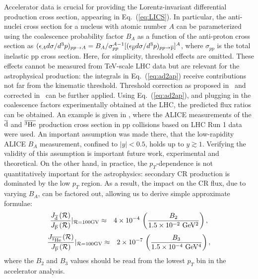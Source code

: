 Accelerator data is crucial for providing the Lorentz-invariant differential production cross section, appearing in Eq.~(\ref{eq:LICS}). 
In particular, the anti-nuclei cross section for a nucleus with atomic number $A$ can be parameterized using the coalescence probability factor $B_A$ as a function of the anti-proton cross section as 
$(\epsilon_A d\sigma/d^3p)_{pp\to A} = B_A/\sigma_{pp}^{A-1} [(\epsilon_{\overline{\rm p}} d\sigma/d^3p)_{pp\to \overline{\rm p}}]^A$, 
where $\sigma_{pp}$ is the total inelastic pp cross section. 
Here, for simplicity, threshold effects are omitted. 
These effects cannot be measured from TeV-scale LHC data but are relevant for the astrophysical production: the integrals in Eq.~(\ref{eq:ad2ap}) receive contributions not far from the kinematic threshold. 
Threshold correction as proposed in~\cite{Duperray:2002pj,Duperray:2003tv} and corrected in~\cite{Blum:2017qnn} can be further applied. 
%
Using Eq.~(\ref{eq:ad2ap}), and plugging in the coalescence factors experimentally obtained at the LHC, the predicted flux ratios can be obtained. 
An example is given in \cite{Blum:2017qnn}, where the ALICE measurements of the $\overline{\rm d}$ and $\overline{^3\rm He}$ production cross section in pp collisions based on LHC Run 1 data ~\cite{Acharya:2017fvb} were used. 
An important assumption was made there, that the low-rapidity ALICE $B_A$ measurement, confined to $|y|<0.5$, holds up to $y\gtrsim1$. Verifying the validity of this assumption is important future work, experimental and theoretical.
On the other hand, in practice, the $p_T$-dependence is not quantitatively important for the astrophysics: secondary CR production is dominated by the low $p_T$ region. As a result, the impact on the CR flux, due to varying $B_A$, can be factored out, allowing us to derive simple approximate formulae:
%
 \begin{eqnarray}\label{eq:J2}\frac{J_{\overline{\rm d}}\left(\R\right)}{J_{\overline{\rm p}}\left(\R\right)}\huge|_{\R=100{\rm GV}}&\approx&4\times10^{-4}\,\left(\frac{B_2}{1.5\times10^{-2}~\rm GeV^2}\right),\end{eqnarray}
%
%
 \begin{eqnarray}\label{eq:J3}\frac{J_{\overline{^3\rm He}}\left(\R\right)}{J_{\overline{\rm p}}\left(\R\right)}\huge|_{\R=100{\rm GV}}&\approx&2\times10^{-7}\,\left(\frac{B_3}{1.5\times10^{-4}~\rm GeV^4}\right),\end{eqnarray}
%
where the $B_2$ and $B_3$ values should be read from the lowest $p_T$ bin in the accelerator analysis. 
%

